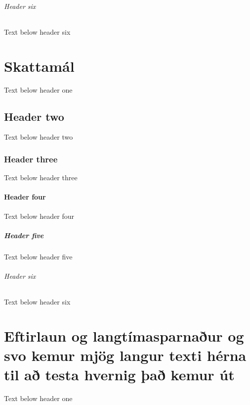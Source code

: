 \documentclass[a4paper,10pt,icelandic]{sphinxmanual}
\begin{document}
\subparagraph{Header six}
\label{\detokenize{personulegar-tryggingar/index:header-six}}
\sphinxAtStartPar
Text below header six

\sphinxstepscope


\chapter{Skattamál}
\label{\detokenize{skattamal/index:skattamal}}\label{\detokenize{skattamal/index::doc}}
\sphinxAtStartPar
Text below header one


\section{Header two}
\label{\detokenize{skattamal/index:header-two}}
\sphinxAtStartPar
Text below header two


\subsection{Header three}
\label{\detokenize{skattamal/index:header-three}}
\sphinxAtStartPar
Text below header three


\subsubsection{Header four}
\label{\detokenize{skattamal/index:header-four}}
\sphinxAtStartPar
Text below header four


\paragraph{Header five}
\label{\detokenize{skattamal/index:header-five}}
\sphinxAtStartPar
Text below header five


\subparagraph{Header six}
\label{\detokenize{skattamal/index:header-six}}
\sphinxAtStartPar
Text below header six

\sphinxstepscope


\chapter{Eftirlaun og langtímasparnaður og svo kemur mjög langur texti hérna til að testa hvernig það kemur út}
\label{\detokenize{eftirlaun-og-langtimassparnadur/index:eftirlaun-og-langtimasparnaur-og-svo-kemur-mjog-langur-texti-herna-til-a-testa-hvernig-a-kemur-ut}}\label{\detokenize{eftirlaun-og-langtimassparnadur/index::doc}}
\sphinxAtStartPar
Text below header one
\end{document}
